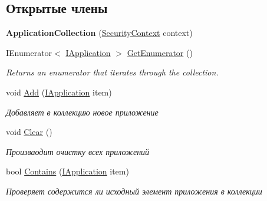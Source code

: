 \subsection*{Открытые члены}
\begin{DoxyCompactItemize}
\item 
\mbox{\label{class_security_1_1_entity_framework_1_1_collections_1_1_application_collection_a4d8ecd8412fbd93cfec6fe58714ad5bd}} 
{\bfseries Application\+Collection} (\hyperlink{class_security_1_1_entity_dal_1_1_security_context}{Security\+Context} context)
\item 
I\+Enumerator$<$ \hyperlink{interface_security_1_1_interfaces_1_1_model_1_1_i_application}{I\+Application} $>$ \hyperlink{class_security_1_1_entity_framework_1_1_collections_1_1_application_collection_a6e8eff09b5c48f61908246f9e17ae861}{Get\+Enumerator} ()
\begin{DoxyCompactList}\small\item\em Returns an enumerator that iterates through the collection. \end{DoxyCompactList}\item 
void \hyperlink{class_security_1_1_entity_framework_1_1_collections_1_1_application_collection_ad4597e37a4157bda5cf46effaaf3f7f5}{Add} (\hyperlink{interface_security_1_1_interfaces_1_1_model_1_1_i_application}{I\+Application} item)
\begin{DoxyCompactList}\small\item\em Добавляет в коллекцию новое приложение \end{DoxyCompactList}\item 
void \hyperlink{class_security_1_1_entity_framework_1_1_collections_1_1_application_collection_a04fd035187ef54f67576f6a428ca7523}{Clear} ()
\begin{DoxyCompactList}\small\item\em Произваодит очистку всех приложений \end{DoxyCompactList}\item 
bool \hyperlink{class_security_1_1_entity_framework_1_1_collections_1_1_application_collection_a55d23c28f629fc2db1fad7ba62f33714}{Contains} (\hyperlink{interface_security_1_1_interfaces_1_1_model_1_1_i_application}{I\+Application} item)
\begin{DoxyCompactList}\small\item\em Проверяет содержится ли исходный элемент приложения в коллекции \end{DoxyCompactList}\item 

\end{DoxyCompactItemize}
